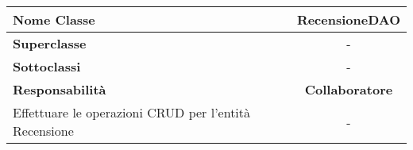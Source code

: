 
\setcounter{table}{0}
\begin{table}[H]
    \centering
    \begin{tabular}{||   l  ||  c   ||}
        \rowcolor{Gray}
        \hline
        \textbf{Nome Classe} & RecensioneDAO\\
        \hline
        \textbf{Superclasse}  &  - \\
        \hline
        \textbf{Sottoclassi} & - \\
        \hline
        \hline
         \textbf{Responsabilità} & \textbf{Collaboratore} \\
         \hline
          Effettuare le operazioni CRUD per l'entità Recensione & - \\
         \hline
    \end{tabular}
\end{table}

    
       
